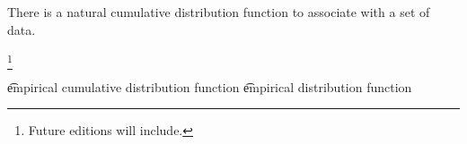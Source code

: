 

There is a natural cumulative distribution function to associate with a set of data.

\footnote{Future editions will include.}

\t{empirical cumulative distribution function} \t{empirical distribution function}

\blankpage
